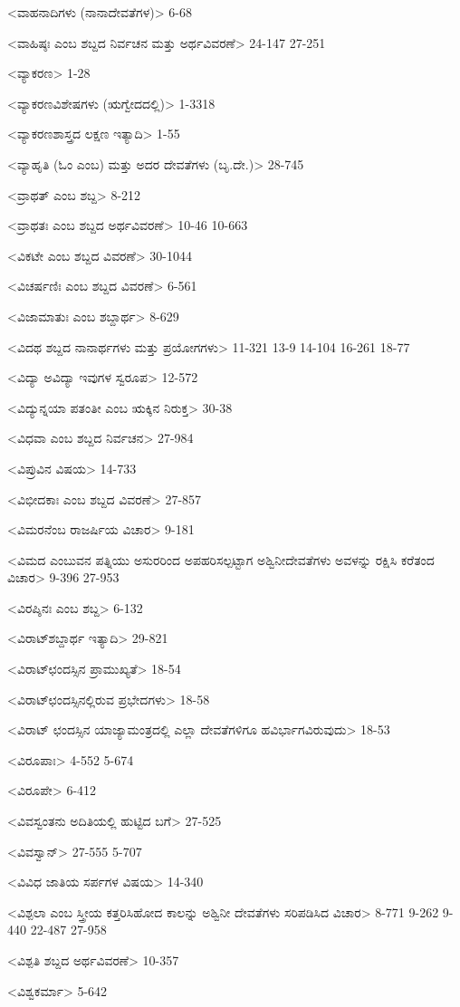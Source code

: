 <ವಾಹನಾದಿಗಳು (ನಾನಾದೇವತೆಗಳ)>
6-68

<ವಾಹಿಷ್ಠಃ ಎಂಬ ಶಬ್ದದ ನಿರ್ವಚನ ಮತ್ತು ಅರ್ಥವಿವರಣೆ>
24-147
27-251

<ವ್ಯಾಕರಣ>
1-28

<ವ್ಯಾಕರಣವಿಶೇಷಗಳು (ಋಗ್ವೇದದಲ್ಲಿ)>
1-3318

<ವ್ಯಾಕರಣಶಾಸ್ತ್ರದ ಲಕ್ಷಣ ಇತ್ಯಾದಿ>
1-55

<ವ್ಯಾಹೃತಿ (ಓಂ ಎಂಬ) ಮತ್ತು ಅದರ ದೇವತೆಗಳು (ಬೃ.ದೇ.)>
28-745

<ವ್ರಾಥತ್‍ ಎಂಬ ಶಬ್ದ>
8-212

<ವ್ರಾಥತಃ ಎಂಬ ಶಬ್ದದ ಅರ್ಥವಿವರಣೆ>
10-46 
10-663

<ವಿಕಟೇ ಎಂಬ ಶಬ್ದದ ವಿವರಣೆ>
30-1044

<ವಿಚರ್ಷಣಿಃ ಎಂಬ ಶಬ್ದದ ವಿವರಣೆ>
6-561

<ವಿಜಾಮಾತುಃ ಎಂಬ ಶಬ್ದಾರ್ಥ>
8-629

<ವಿದಥ ಶಬ್ದದ ನಾನಾರ್ಥಗಳು ಮತ್ತು ಪ್ರಯೋಗಗಳು>
11-321 
13-9 
14-104 
16-261
18-77

<ವಿದ್ಯಾ ಅವಿದ್ಯಾ ಇವುಗಳ ಸ್ವರೂಪ>
12-572

<ವಿದ್ಯುನ್ನಯಾ ಪತಂತೀ ಎಂಬ ಋಕ್ಕಿನ ನಿರುಕ್ತ>
30-38

<ವಿಧವಾ ಎಂಬ ಶಬ್ದದ ನಿರ್ವಚನ>
27-984

<ವಿಪ್ರುವಿನ ವಿಷಯ>
14-733

<ವಿಭೀದಕಾಃ ಎಂಬ ಶಬ್ದದ ವಿವರಣೆ>
27-857

<ವಿಮರನೆಂಬ ರಾಜರ್ಷಿಯ ವಿಚಾರ>
9-181

<ವಿಮದ ಎಂಬುವನ ಪತ್ನಿಯು ಅಸುರರಿಂದ ಅಪಹರಿಸಲ್ಪಟ್ಟಾಗ ಅಶ್ವಿನೀದೇವತೆಗಳು ಅವಳನ್ನು ರಕ್ಷಿಸಿ ಕರೆತಂದ ವಿಚಾರ>
9-396
27-953

<ವಿರಪ್ಶಿನಃ ಎಂಬ ಶಬ್ದ>
6-132

<ವಿರಾಟ್‍ಶಬ್ದಾರ್ಥ ಇತ್ಯಾದಿ>
29-821

<ವಿರಾಟ್‍ಛಂದಸ್ಸಿನ ಪ್ರಾಮುಖ್ಯತೆ>
18-54

<ವಿರಾಟ್‍ಛಂದಸ್ಸಿನಲ್ಲಿರುವ ಪ್ರಭೇದಗಳು>
18-58

<ವಿರಾಟ್‍ ಛಂದಸ್ಸಿನ ಯಾಜ್ಯಾಮಂತ್ರದಲ್ಲಿ ಎಲ್ಲಾ ದೇವತೆಗಳಿಗೂ ಹವಿರ್ಭಾಗವಿರುವುದು>
18-53

<ವಿರೂಪಾಃ>
4-552
5-674

<ವಿರೂಪೇ>
6-412

<ವಿವಸ್ವಂತನು ಅದಿತಿಯಲ್ಲಿ ಹುಟ್ಟಿದ ಬಗೆ>
27-525

<ವಿವಸ್ವಾನ್‍>
27-555
5-707

<ವಿವಿಧ ಜಾತಿಯ ಸರ್ಪಗಳ ವಿಷಯ>
14-340

<ವಿಶ್ಪಲಾ ಎಂಬ ಸ್ತ್ರೀಯ ಕತ್ತರಿಸಿಹೋದ ಕಾಲನ್ನು ಅಶ್ವಿನೀ ದೇವತೆಗಳು ಸರಿಪಡಿಸಿದ ವಿಚಾರ>
8-771
9-262 
9-440
22-487 
27-958

<ವಿಶ್ಪತಿ ಶಬ್ದದ ಅರ್ಥವಿವರಣೆ>
10-357

<ವಿಶ್ವಕರ್ಮಾ>
5-642

